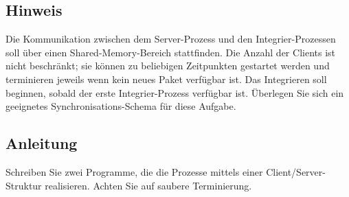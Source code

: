 \subsection*{Hinweis}
Die Kommunikation zwischen dem Server-Prozess und den Integrier-Prozessen soll
über einen Shared-Memory-Bereich stattfinden. Die Anzahl der Clients ist nicht
beschränkt; sie können zu beliebigen Zeitpunkten gestartet werden und
terminieren jeweils wenn kein neues Paket verfügbar ist. Das Integrieren soll
beginnen, sobald der erste Integrier-Prozess verfügbar ist. Überlegen Sie sich
ein geeignetes Synchronisations-Schema für diese Aufgabe.

\subsection*{Anleitung}
Schreiben Sie zwei Programme, die die Prozesse mittels einer
Client/Server-Struktur realisieren. Achten Sie auf saubere Terminierung.

\osueguidelinesthree



